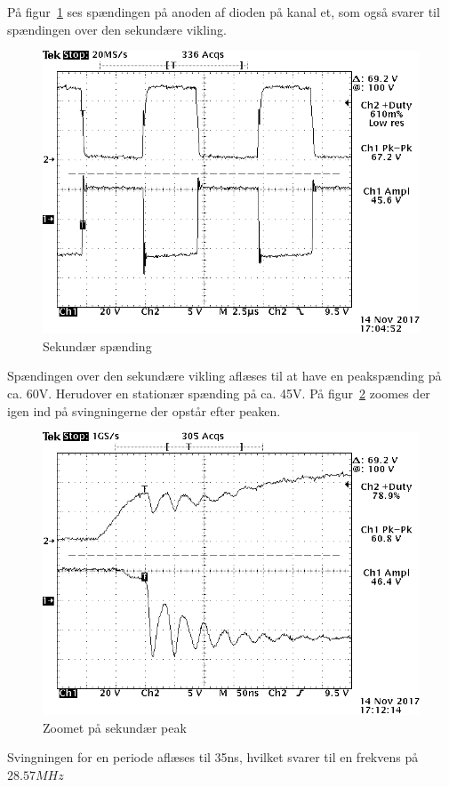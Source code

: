 \noindent På figur~\ref{fig:sek} ses spændingen på anoden af dioden på kanal et, som også svarer til spændingen over den sekundære vikling.
\begin{figure}[H]
	\center
	\includegraphics[max width=0.7\linewidth]{../dokumentation/tex/2iteration/billeder/Realisering/Transformator_sekundar.png}
	\caption{Sekundær spænding}
	\label{fig:sek}
\end{figure}
\noindent Spændingen over den sekundære vikling aflæses til at have en peakspænding på ca. 60V. Herudover en stationær spænding på ca. 45V. 
På figur~\ref{fig:sekzoom} zoomes der igen ind på svingningerne der opstår efter peaken.
\begin{figure}[H]
	\center
	\includegraphics[max width=0.7\linewidth]{../dokumentation/tex/2iteration/billeder/Realisering/Transformator_sekundarzoomrise.png}
	\caption{Zoomet på sekundær peak}
	\label{fig:sekzoom}
\end{figure}
\noindent Svingningen for en periode aflæses til 35ns, hvilket svarer til en frekvens på $28.57MHz$

